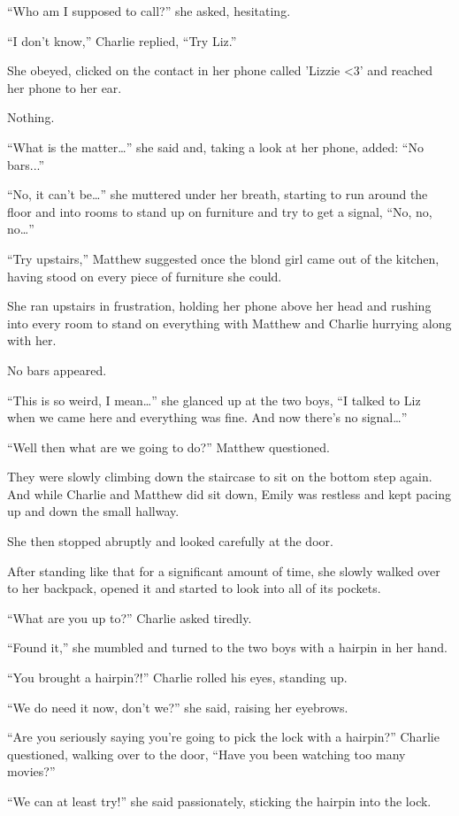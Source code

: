 “Who am I supposed to call?” she asked, hesitating.

“I don't know,” Charlie replied, “Try Liz.”

She obeyed, clicked on the contact in her phone called 'Lizzie <3' and reached her phone to her ear.

Nothing.

“What is the matter…” she said and, taking a look at her phone, added: “No bars...”

“No, it can't be…” she muttered under her breath, starting to run around the floor and into rooms to stand up on furniture and try to get a signal, “No, no, no…”

“Try upstairs,” Matthew suggested once the blond girl came out of the kitchen, having stood on every piece of furniture she could.

She ran upstairs in frustration, holding her phone above her head and rushing into every room to stand on everything with Matthew and Charlie hurrying along with her.

No bars appeared.

“This is so weird, I mean…” she glanced up at the two boys, “I talked to Liz when we came here and everything was fine. And now there's no signal…”

“Well then what are we going to do?” Matthew questioned.

They were slowly climbing down the staircase to sit on the bottom step again. And while Charlie and Matthew did sit down, Emily was restless and kept pacing up and down the small hallway.

She then stopped abruptly and looked carefully at the door.

After standing like that for a significant amount of time, she slowly walked over to her backpack, opened it and started to look into all of its pockets.

“What are you up to?” Charlie asked tiredly.

“Found it,” she mumbled and turned to the two boys with a hairpin in her hand.

“You brought a hairpin?!” Charlie rolled his eyes, standing up.

“We do need it now, don't we?” she said, raising her eyebrows.

“Are you seriously saying you're going to pick the lock with a hairpin?” Charlie questioned, walking over to the door, “Have you been watching too many movies?”

“We can at least try!” she said passionately, sticking the hairpin into the lock.

